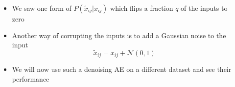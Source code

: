 \begin{frame}

  \begin{columns}
        \begin{overlayarea}{\textwidth}{\textheight}
            
        \end{overlayarea}

    \begin{overlayarea}{\textwidth}{\textheight}
        \begin{itemize}\justifying
            \item<1-> We saw one form of $P(\widetilde{x}_{ij} | x_{ij})$ which flips a fraction $q$ of the inputs to zero
            \item<2-> Another way of corrupting the inputs is to add a Gaussian noise to the input \\
            \[\widetilde{x}_{ij} = x_{ij} + \mathscr{N}(0,1)\]
            \item<3-> We will now use such a denoising AE on a different dataset and see their performance
        \end{itemize}
    \end{overlayarea}
  \end{columns}
\end{frame}

